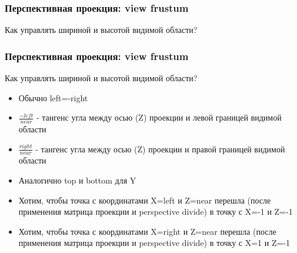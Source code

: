 \documentclass{beamer}
\begin{document}
\begin{frame}[fragile]
\frametitle{Перспективная проекция: view frustum}
Как управлять шириной и высотой видимой области?
\end{frame}

\begin{frame}[fragile]
\frametitle{Перспективная проекция: view frustum}
Как управлять шириной и высотой видимой области?
\begin{itemize}
\item Обычно left=-right
\pause
\item \begin{math}\frac{-left}{near}\end{math} - тангенс угла между осью (Z) проекции и левой границей видимой области
\item \begin{math}\frac{right}{near}\end{math} - тангенс угла между осью (Z) проекции и правой границей видимой области
\pause
\item Аналогично top и bottom для Y
\pause
\item Хотим, чтобы точка с координатами X=left и Z=near перешла (после применения матрица проекции и perspective divide) в точку с X=-1 и Z=-1
\item Хотим, чтобы точка с координатами X=right и Z=near перешла (после применения матрица проекции и perspective divide) в точку с X=1 и Z=-1
\end{itemize}
\end{frame}
\end{document}
